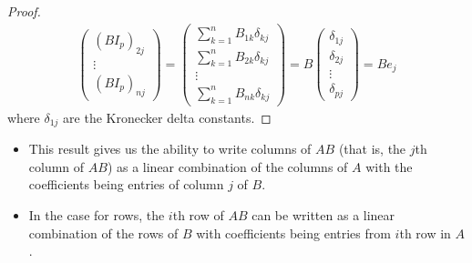 \begin{proof}
\begin{align*}
\begin{pmatrix}
        {(B{I}_{p})}_{2j} \\
        \vdots \\
        {(B {I}_{p})}_{nj}
   \end{pmatrix} = \begin{pmatrix}
       \sum_{ k=1  }^{ n } {B}_{1k} {\delta}_{kj} \\
       \sum_{ k=1  }^{ n } {B}_{2k} {\delta}_{kj } \\
       \vdots \\
       \sum_{ k=1  }^{ n } {B}_{nk} {\delta}_{kj } 
       \end{pmatrix} = B \begin{pmatrix}
       {\delta}_{1j } \\
       {\delta}_{2j } \\
       \vdots \\
       {\delta}_{pj } 
   \end{pmatrix} = B {e}_{j}
\end{align*}
where \( {\delta}_{1j} \) are the Kronecker delta constants.
\end{proof}

\begin{itemize}
    \item This result gives us the ability to write columns of \( AB  \) (that is, the \( j \)th column of \( AB \)) as a linear combination of the columns of \( A  \) with the coefficients being entries of column \( j  \) of \( B  \).
    \item In the case for rows, the \( i \)th row of \( AB  \) can be written as a linear combination of the rows of \( B  \) with coefficients being entries from \( i \)th row in \( A  \).
\end{itemize}

